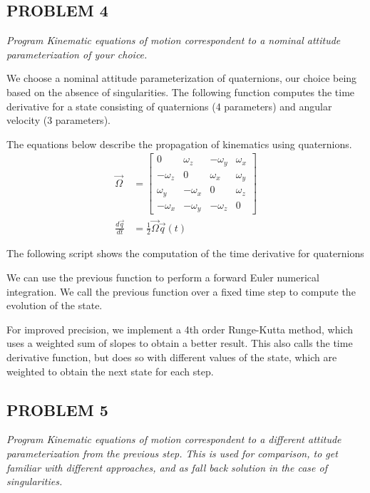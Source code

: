 \subsection{PROBLEM 4}
\textit{Program Kinematic equations of motion correspondent to a nominal attitude parameterization of your choice.}

We choose a nominal attitude parameterization of quaternions, our choice being based on the absence of singularities. The following function computes the time derivative for a state consisting of quaternions (4 parameters) and angular velocity (3 parameters).

The equations below describe the propagation of kinematics using quaternions.
\begin{align*}
\Vec{\Omega} &= 
    \begin{bmatrix}
    0 & \omega_{z} & -\omega_{y} & \omega_{x}\\
    -\omega_{z} & 0 & \omega_{x} & \omega_{y}\\
    \omega_{y} & -\omega_{x} & 0 & \omega_{z}\\
    -\omega_{x} & -\omega_{y} & -\omega_{z} & 0
    \end{bmatrix}\\
\frac{d \Vec{q}}{dt} &= \frac{1}{2} \Vec{\Omega} \Vec{q}(t)
\end{align*}

The following script shows the computation of the time derivative for quaternions



We can use the previous function to perform a forward Euler numerical integration. We call the previous function over a fixed time step to compute the evolution of the state.



For improved precision, we implement a 4th order Runge-Kutta method, which uses a weighted sum of slopes to obtain a better result. This also calls the time derivative function, but does so with different values of the state, which are weighted to obtain the next state for each step.




\subsection{PROBLEM 5}
\textit{Program Kinematic equations of motion correspondent to a different attitude parameterization from the previous step. This is used for comparison, to get familiar with different approaches, and as fall back solution in the case of singularities.}


